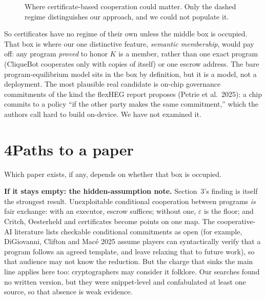 \documentclass[11pt]{article}
\begin{document}
\begin{figure}[h]
\centering
{}
\caption{Where certificate-based cooperation could matter. Only the dashed regime distinguishes our approach, and we could not populate it.}
\label{fig:executor}
\end{figure}

So certificates have no regime of their own unless the middle box is occupied. That box is where our one distinctive feature, \emph{semantic membership}, would pay off: any program \emph{proved} to honor $K$ is a member, rather than one exact program (CliqueBot cooperates only with copies of itself) or one escrow address. The bare program-equilibrium model sits in the box by definition, but it is a model, not a deployment. The most plausible real candidate is on-chip governance commitments of the kind the flexHEG report proposes (Petrie et al.\ 2025): a chip commits to a policy ``if the other party makes the same commitment,'' which the authors call hard to build on-device. We have not examined it.

\section*{4\quad Paths to a paper}

Which paper exists, if any, depends on whether that box is occupied.

\textbf{If it stays empty: the hidden-assumption note.} Section~3's finding is itself the strongest result. Unexploitable conditional cooperation between programs \emph{is} fair exchange: with an executor, escrow suffices; without one, $\varepsilon$ is the floor; and Critch, Oesterheld and certificates become points on one map. The cooperative-AI literature lists checkable conditional commitments as open (for example, DiGiovanni, Clifton and Macé 2025 assume players can syntactically verify that a program follows an agreed template, and leave relaxing that to future work), so that audience may not know the reduction. But the charge that sinks the main line applies here too: cryptographers may consider it folklore. Our searches found no written version, but they were snippet-level and confabulated at least one source, so that absence is weak evidence.
\end{document}
